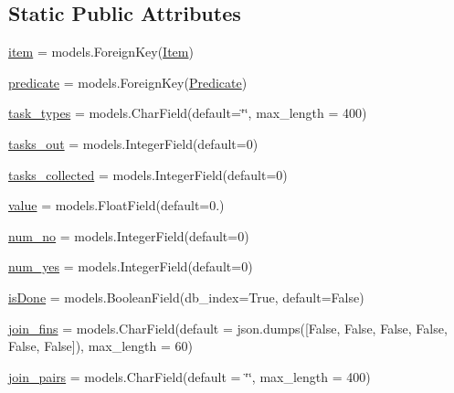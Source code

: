 \subsection*{Static Public Attributes}
\begin{DoxyCompactItemize}
\item 
\mbox{\hyperlink{classdynamicfilterapp_1_1models_1_1_i_p___pair_a4ed071da1d42b95e2465fb30952d9f80}{item}} = models.\+Foreign\+Key(\mbox{\hyperlink{classdynamicfilterapp_1_1models_1_1_item}{Item}})
\item 
\mbox{\hyperlink{classdynamicfilterapp_1_1models_1_1_i_p___pair_a59edc4e3874fffd0c2a9ef88cddfc0fa}{predicate}} = models.\+Foreign\+Key(\mbox{\hyperlink{classdynamicfilterapp_1_1models_1_1_predicate}{Predicate}})
\item 
\mbox{\hyperlink{classdynamicfilterapp_1_1models_1_1_i_p___pair_a24192fa356f5262f109cd5e03aabcb63}{task\+\_\+types}} = models.\+Char\+Field(default=\char`\"{}\char`\"{}, max\+\_\+length = 400)
\item 
\mbox{\hyperlink{classdynamicfilterapp_1_1models_1_1_i_p___pair_a3f60ead9e071700c26f1b3316e21cfab}{tasks\+\_\+out}} = models.\+Integer\+Field(default=0)
\item 
\mbox{\hyperlink{classdynamicfilterapp_1_1models_1_1_i_p___pair_a898da826737238e06b351e5100410bde}{tasks\+\_\+collected}} = models.\+Integer\+Field(default=0)
\item 
\mbox{\hyperlink{classdynamicfilterapp_1_1models_1_1_i_p___pair_afcc7a4b78ecd8fa7e713f8cfa0f51017}{value}} = models.\+Float\+Field(default=0.)
\item 
\mbox{\hyperlink{classdynamicfilterapp_1_1models_1_1_i_p___pair_a1404efbdb930f496cf5b5db3b4725f4a}{num\+\_\+no}} = models.\+Integer\+Field(default=0)
\item 
\mbox{\hyperlink{classdynamicfilterapp_1_1models_1_1_i_p___pair_aaff200381c3b7863a961b3b8f6c7c64b}{num\+\_\+yes}} = models.\+Integer\+Field(default=0)
\item 
\mbox{\hyperlink{classdynamicfilterapp_1_1models_1_1_i_p___pair_a9dde5beb8f6ffe59012e1b7c5ef641ef}{is\+Done}} = models.\+Boolean\+Field(db\+\_\+index=True, default=False)
\item 
\mbox{\hyperlink{classdynamicfilterapp_1_1models_1_1_i_p___pair_a7e12dec29e5e01e8a9a2db5b2dc6bd71}{join\+\_\+fins}} = models.\+Char\+Field(default = json.\+dumps(\mbox{[}False, False, False, False, False, False\mbox{]}), max\+\_\+length = 60)
\item 
\mbox{\hyperlink{classdynamicfilterapp_1_1models_1_1_i_p___pair_af9b68ef0f5d6fd8f26e308d47de43a88}{join\+\_\+pairs}} = models.\+Char\+Field(default = \char`\"{}\char`\"{}, max\+\_\+length = 400)

\end{DoxyCompactItemize}
